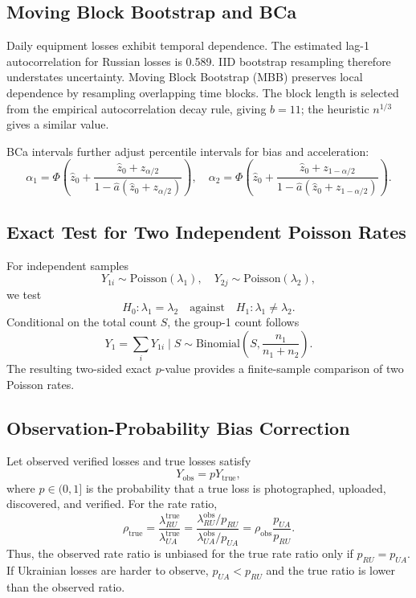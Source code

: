 \documentclass[a4paper,11pt]{article}
\begin{document}
\subsection{Moving Block Bootstrap and BCa}

Daily equipment losses exhibit temporal dependence. The estimated lag-1 autocorrelation for Russian losses is 0.589. IID bootstrap resampling therefore understates uncertainty. Moving Block Bootstrap (MBB) preserves local dependence by resampling overlapping time blocks. The block length is selected from the empirical autocorrelation decay rule, giving $b=11$; the heuristic $n^{1/3}$ gives a similar value.

BCa intervals further adjust percentile intervals for bias and acceleration:
\[
\alpha_1=\Phi\left(\hat{z}_0+\frac{\hat{z}_0+z_{\alpha/2}}{1-\hat{a}(\hat{z}_0+z_{\alpha/2})}\right),
\quad
\alpha_2=\Phi\left(\hat{z}_0+\frac{\hat{z}_0+z_{1-\alpha/2}}{1-\hat{a}(\hat{z}_0+z_{1-\alpha/2})}\right).
\]

\subsection{Exact Test for Two Independent Poisson Rates}

For independent samples
\[
Y_{1i}\sim\mathrm{Poisson}(\lambda_1),\quad
Y_{2j}\sim\mathrm{Poisson}(\lambda_2),
\]
we test
\[
H_0:\lambda_1=\lambda_2\quad\text{against}\quad H_1:\lambda_1\neq\lambda_2.
\]
Conditional on the total count $S$, the group-1 count follows
\[
Y_1=\sum_iY_{1i}\mid S \sim \mathrm{Binomial}\left(S,\frac{n_1}{n_1+n_2}\right).
\]
The resulting two-sided exact $p$-value provides a finite-sample comparison of two Poisson rates.

\subsection{Observation-Probability Bias Correction}

Let observed verified losses and true losses satisfy
\[
Y_{\mathrm{obs}}=pY_{\mathrm{true}},
\]
where $p\in(0,1]$ is the probability that a true loss is photographed, uploaded, discovered, and verified. For the rate ratio,
\[
\rho_{\mathrm{true}}
=\frac{\lambda_{RU}^{\mathrm{true}}}{\lambda_{UA}^{\mathrm{true}}}
=\frac{\lambda_{RU}^{\mathrm{obs}}/p_{RU}}{\lambda_{UA}^{\mathrm{obs}}/p_{UA}}
=\rho_{\mathrm{obs}}\frac{p_{UA}}{p_{RU}}.
\]
Thus, the observed rate ratio is unbiased for the true rate ratio only if $p_{RU}=p_{UA}$. If Ukrainian losses are harder to observe, $p_{UA}<p_{RU}$ and the true ratio is lower than the observed ratio.
\end{document}
